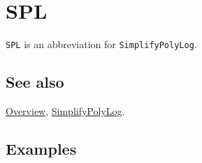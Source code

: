 \documentclass[../FeynCalcManual.tex]{subfiles}
\begin{document}
\hypertarget{spl}{
\section{SPL}\label{spl}}

\texttt{SPL} is an abbreviation for \texttt{SimplifyPolyLog}.

\subsection{See also}

\hyperlink{toc}{Overview}, \hyperlink{simplifypolylog}{SimplifyPolyLog}.

\subsection{Examples}
\end{document}
